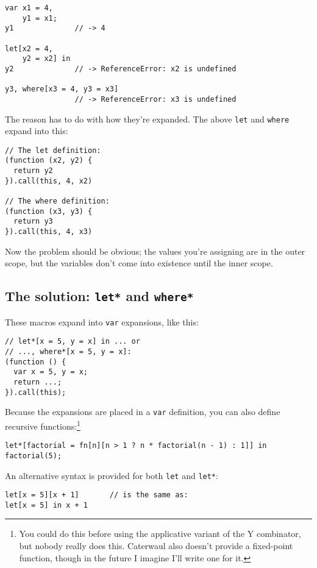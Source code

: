\documentclass{report}
\begin{document}
\begin{verbatim}
var x1 = 4,
    y1 = x1;
y1              // -> 4

let[x2 = 4,
    y2 = x2] in
y2              // -> ReferenceError: x2 is undefined

y3, where[x3 = 4, y3 = x3]
                // -> ReferenceError: x3 is undefined
\end{verbatim}

      The reason has to do with how they're expanded. The above {\tt let} and {\tt where} expand into this:

\begin{verbatim}
// The let definition:
(function (x2, y2) {
  return y2
}).call(this, 4, x2)

// The where definition:
(function (x3, y3) {
  return y3
}).call(this, 4, x3)
\end{verbatim}

      Now the problem should be obvious; the values you're assigning are in the outer scope, but the variables don't come into existence until the inner scope.

\subsection{The solution: {\tt let*} and {\tt where*}}\label{sec:the-std-library-let-and-where-star}
      These macros expand into {\tt var} expansions, like this:

\begin{verbatim}
// let*[x = 5, y = x] in ... or
// ..., where*[x = 5, y = x]:
(function () {
  var x = 5, y = x;
  return ...;
}).call(this);
\end{verbatim}

      Because the expansions are placed in a {\tt var} definition, you can also define recursive functions:\footnote{You could do this before using the applicative variant of the Y combinator,
      but nobody really does this. Caterwaul also doesn't provide a fixed-point function, though in the future I imagine I'll write one for it.}

\begin{verbatim}
let*[factorial = fn[n][n > 1 ? n * factorial(n - 1) : 1]] in factorial(5);
\end{verbatim}

      An alternative syntax is provided for both {\tt let} and {\tt let*}:

\begin{verbatim}
let[x = 5][x + 1]       // is the same as:
let[x = 5] in x + 1
\end{verbatim}
\end{document}
